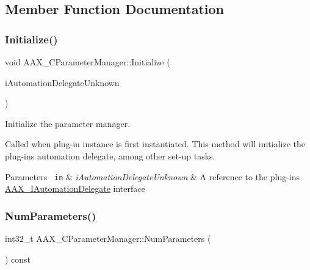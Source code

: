 \subsection{Member Function Documentation}
\mbox{\label{a01545_ab7921f8b312d65917e3b38c5edfb57d8}} 
\subsubsection{\texorpdfstring{Initialize()}{Initialize()}}
{\footnotesize\ttfamily void A\+A\+X\+\_\+\+C\+Parameter\+Manager\+::\+Initialize (\begin{DoxyParamCaption}\item[{\mbox{\hyperlink{a01773}{A\+A\+X\+\_\+\+I\+Automation\+Delegate}} $\ast$}]{i\+Automation\+Delegate\+Unknown }\end{DoxyParamCaption})}



Initialize the parameter manager. 

Called when plug-\/in instance is first instantiated. This method will initialize the plug-\/in\textquotesingle{}s automation delegate, among other set-\/up tasks.


\begin{DoxyParams}[1]{Parameters}
\mbox{\texttt{ in}}  & {\em i\+Automation\+Delegate\+Unknown} & A reference to the plug-\/in\textquotesingle{}s \mbox{\hyperlink{a01773}{A\+A\+X\+\_\+\+I\+Automation\+Delegate}} interface \\
\hline
\end{DoxyParams}
\mbox{\label{a01545_a78b8c6b1545b42123c2b6ff4dad9b386}} 
\subsubsection{\texorpdfstring{NumParameters()}{NumParameters()}}
{\footnotesize\ttfamily int32\+\_\+t A\+A\+X\+\_\+\+C\+Parameter\+Manager\+::\+Num\+Parameters (\begin{DoxyParamCaption}{ }\end{DoxyParamCaption}) const}



